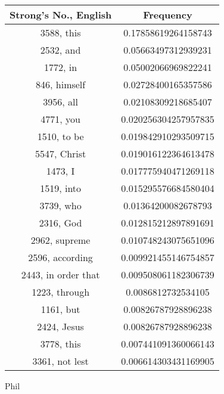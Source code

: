 \documentclass[12pt,letterpaper]{article}
\begin{document}
 \begin{longtable}{|c|c|}
\hline
 Strong's No., English & Frequency \\ \hline  
3588, this & 0.17858619264158743\\ \hline 
 2532, and & 0.05663497312939231\\ \hline 
 1772, in & 0.05002066969822241\\ \hline 
 846, himself & 0.02728400165357586\\ \hline 
 3956, all & 0.02108309218685407\\ \hline 
 4771, you & 0.020256304257957835\\ \hline 
 1510, to be & 0.019842910293509715\\ \hline 
 5547, Christ & 0.019016122364613478\\ \hline 
 1473, I & 0.017775940471269118\\ \hline 
 1519, into & 0.015295576684580404\\ \hline 
 3739, who & 0.01364200082678793\\ \hline 
 2316, God & 0.012815212897891691\\ \hline 
 2962, supreme & 0.010748243075651096\\ \hline 
 2596, according & 0.009921455146754857\\ \hline 
 2443, in order that & 0.009508061182306739\\ \hline 
 1223, through & 0.0086812732534105\\ \hline 
 1161, but & 0.00826787928896238\\ \hline 
 2424, Jesus & 0.00826787928896238\\ \hline 
 3778, this & 0.007441091360066143\\ \hline 
 3361, not lest & 0.006614303431169905\\ \hline 
\end{longtable} 
 

Phil
\end{document}
